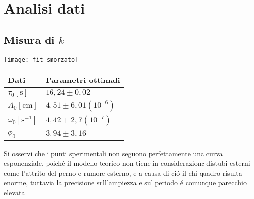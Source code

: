 \documentclass{exam}
\begin{document}
	\section{Analisi dati}
		\subsection{Misura di $k$}
			
			\begin{minipage}{0.5\textwidth}
				\texttt{[image: fit\_smorzato]}
				\end{minipage}
			\begin{minipage}{0.5\textwidth}
				\begin{tabular}{ll}
					\toprule
					Dati & Parametri ottimali \\
					\midrule
					$\tau_{0}[\textrm{s}]$ & $16,24 \pm 0,02$ \\
					$A_{0}[\textrm{cm}]$ & $4,51 \pm 6,01(10^{-6})$\\
					$\omega_{0}[\textrm{s}^{-1}]$ & $4,42 \pm 2,7(10^{-7})$\\			
					$\phi_{0}$ & $3,94 \pm 3,16$\\
					\bottomrule

				\end{tabular}
			\end{minipage}
			Si osservi che i punti sperimentali non seguono perfettamente una curva esponenziale, poich\'e il modello teorico non tiene in considerazione distubi esterni come l'attrito del perno e rumore esterno, e a causa di ci\'o il chi quadro risulta enorme, tuttavia la precisione sull'ampiezza e sul periodo \'e comunque parecchio elevata

\end{document}
